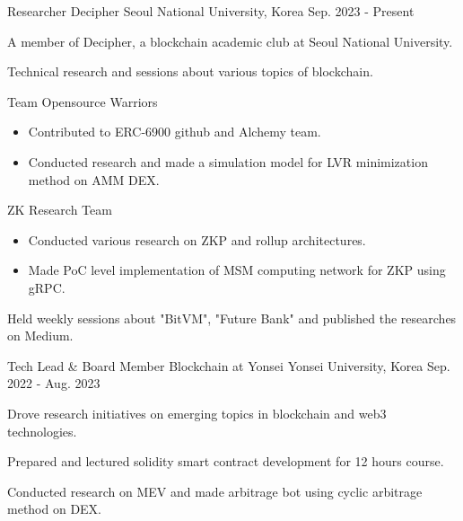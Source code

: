 


\begin{cventries}


\cventry
{Researcher} %
{Decipher} %
{Seoul National University, Korea} %
{Sep. 2023 - Present} %
{ %
\begin{cvitems}
\item {A member of Decipher, a blockchain academic club at Seoul National University.}
\item {Technical research and sessions about various topics of blockchain.}
\item {Team Opensource Warriors}
\begin{itemize}
  \item {Contributed to ERC-6900 github and Alchemy team.}
  \item {Conducted research and made a simulation model for LVR minimization method on AMM DEX.}
\end{itemize}
\item {ZK Research Team}
\begin{itemize}
  \item {Conducted various research on ZKP and rollup architectures.}
  \item {Made PoC level implementation of MSM computing network for ZKP using gRPC.}
\end{itemize}
\item {Held weekly sessions about "BitVM", "Future Bank" and published the researches on Medium.}
\end{cvitems}
}


\cventry
{Tech Lead \& Board Member} %
{Blockchain at Yonsei} %
{Yonsei University, Korea} %
{Sep. 2022 - Aug. 2023} %
{ %
\begin{cvitems}
\item {Drove research initiatives on emerging topics in blockchain and web3 technologies.}
\item {Prepared and lectured solidity smart contract development for 12 hours course.}
\item {Conducted research on MEV and made arbitrage bot using cyclic arbitrage method on DEX.}
\end{cvitems}
}


\end{cventries}
